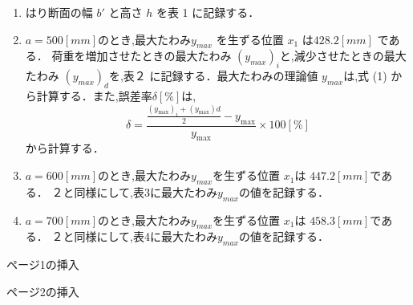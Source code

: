 \documentclass[a4paper,12pt]{jsarticle}
\begin{document}
\begin{enumerate}
  \item はり断面の幅 $b'$ と高さ $h$ を表 1 に記録する．
  \item $a = 500 [mm] $のとき,最大たわみ$y_{max}$ を生ずる位置 $x_1$ は$ 428.2 [mm]$ である．
  荷重を増加させたときの最大たわみ $(y_{max})_i$と,減少させたときの最大たわみ $(y_{max})_d$を,表２
  に記録する．最大たわみの理論値 $y_{max}$は,式 (1) から計算する．また,誤差率$ \delta [\%]$は,
  \begin{equation} 
    \delta = \frac{{\frac{{(y_{\text{max}})_i + (y_{\text{max}})d}}{2} - y_{\text{max}}}}{{y_{\text{max}}}} \times 100[\%]
  \end{equation}
  から計算する．
  \item $a = 600 [mm] $のとき,最大たわみ$ y_{max}$を生ずる位置 $x_1$は $447.2 [mm] $である．
  ２と同様にして,表3に最大たわみ$y_{max}$の値を記録する．
  \item $a = 700 [mm] $のとき,最大たわみ$ y_{max}$を生ずる位置 $x_1$は $458.3 [mm] $である．
  ２と同様にして,表4に最大たわみ$y_{max}$の値を記録する．
\end{enumerate}

\clearpage
ページ1の挿入

\clearpage

ページ2の挿入
\clearpage
\end{document}
